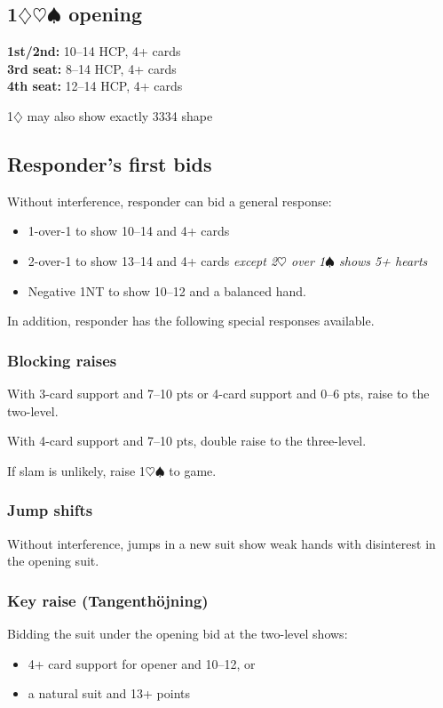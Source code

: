 \documentclass[a4paper, twoside, 11pt]{article}
\begin{document}
\begin{multicols}{3}
\section{1$\diamondsuit\heartsuit\spadesuit$ opening}


\textbf{1st/2nd:} 10--14 HCP, 4+ cards \\ \textbf{3rd seat:} 8--14 HCP, 4+ cards \\ \textbf{4th seat:} 12--14 HCP, 4+ cards

\textsf{1$\diamondsuit$ may also show exactly 3334 shape}

\subsection*{Responder's first bids}

Without interference, responder can bid a general response:
\begin{itemize}
    \item 1-over-1 to show 10--14 and 4+ cards
    \item 2-over-1 to show 13--14 and 4+ cards \textit{except 2$\heartsuit$ over 1$\spadesuit$ shows 5+ hearts}
    \item Negative 1NT to show 10--12 and a balanced hand.
\end{itemize}

In addition, responder has the following special responses available.

\subsubsection*{Blocking raises}

With 3-card support and 7--10 pts or 4-card support and 0--6 pts, raise to the two-level.

With 4-card support and 7--10 pts, double raise to the three-level.

If slam is unlikely, raise 1$\heartsuit\spadesuit$ to game.

\subsubsection*{Jump shifts}
Without interference, jumps in a new suit show weak hands with disinterest in the opening suit.

\subsubsection*{Key raise (Tangenthöjning)}
Bidding the suit under the opening bid at the two-level shows:
\begin{itemize}
    \item 4+ card support for opener and 10--12, or
    \item a natural suit and 13+ points
\end{itemize}


\end{multicols}
\end{document}
